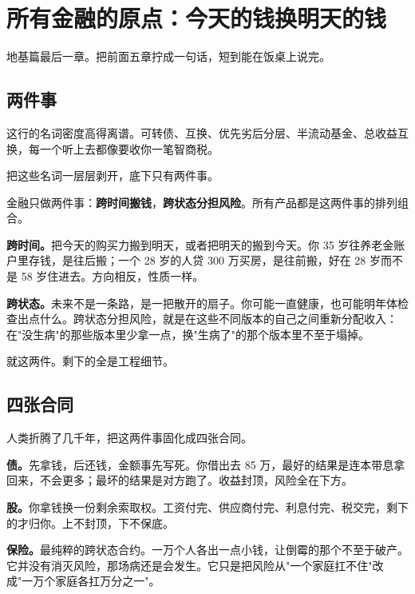 \chapter{所有金融的原点：今天的钱换明天的钱}

\begin{ledetext}
地基篇最后一章。把前面五章拧成一句话，短到能在饭桌上说完。
\end{ledetext}

\section{两件事}

这行的名词密度高得离谱。可转债、互换、优先劣后分层、半流动基金、总收益互换，每一个听上去都像要收你一笔智商税。

把这些名词一层层剥开，底下只有两件事。

\begin{pullquote}{}
金融只做两件事：\textbf{跨时间搬钱}，\textbf{跨状态分担风险}。所有产品都是这两件事的排列组合。
\end{pullquote}

\textbf{跨时间。}把今天的购买力搬到明天，或者把明天的搬到今天。你 35 岁往养老金账户里存钱，是往后搬；一个 28 岁的人贷 300 万买房，是往前搬，好在 28 岁而不是 58 岁住进去。方向相反，性质一样。

\textbf{跨状态。}未来不是一条路，是一把散开的扇子。你可能一直健康，也可能明年体检查出点什么。跨状态分担风险，就是在这些不同版本的自己之间重新分配收入：在"没生病"的那些版本里少拿一点，换"生病了"的那个版本里不至于塌掉。

就这两件。剩下的全是工程细节。

\section{四张合同}

人类折腾了几千年，把这两件事固化成四张合同。

\textbf{债。}先拿钱，后还钱，金额事先写死。你借出去 85 万，最好的结果是连本带息拿回来，不会更多；最坏的结果是对方跑了。收益封顶，风险全在下方。

\textbf{股。}你拿钱换一份剩余索取权。工资付完、供应商付完、利息付完、税交完，剩下的才归你。上不封顶，下不保底。

\textbf{保险。}最纯粹的跨状态合约。一万个人各出一点小钱，让倒霉的那个不至于破产。它并没有消灭风险，那场病还是会发生。它只是把风险从"一个家庭扛不住"改成"一万个家庭各扛万分之一"。

